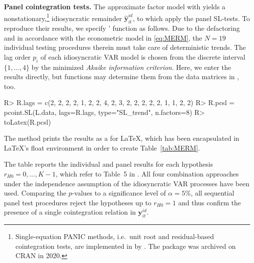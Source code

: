 \textbf{Panel cointegration tests.} The approximate factor model with  yields a nonstationary,\footnote{Single-equation PANIC methods, i.e.~unit root and residual-based cointegration tests, are implemented in  by \citet{Bronder2016}. The  package was archived on CRAN in 2020.} idiosyncratic remainder $ \boldsymbol{\hat{y}}^{i \! d}_{it} $, to which \citet{OersalArsova2017} apply the panel SL-tests. To reproduce their results, we specify ' function  as follows. Due to the defactoring and in accordance with the econometric model in \eqref{eq:MERM}, the $ N=19 $ individual testing procedures therein must take care of deterministic trends. The lag order $ p_i $ of each idiosyncratic VAR model is chosen from the discrete interval $ \lbrace 1,\ldots,4 \rbrace $ by the minimized \textit{Akaike information criterion}. Here, we enter the results directly, but  functions may determine them from the data matrices in , too.
\begin{CodeChunk}
\begin{CodeInput}
R> R.lags = c(2, 2, 2, 2, 1, 2, 2, 4, 2, 3, 2, 2, 2, 2, 2, 1, 1, 2, 2)
R> R.pcsl = pcoint.SL(L.data, lags=R.lags, type="SL_trend", n.factors=8)
R> toLatex(R.pcsl)
\end{CodeInput}
\end{CodeChunk}
The method  prints the  results as a  for LaTeX, which has been encapsulated in LaTeX's float environment in order to create Table~\ref{tab:MERM}. 
\begin{table}[ht]	%
	\centering
	\caption[Cointegration rank tests]{Panel cointegration rank tests for MERM.} 
	\resizebox{0.8\textwidth}{!}{
		}	
	\label{tab:MERM}
\end{table}
The table reports the individual and panel results for each hypothesis $ r_{H0} = 0, \ldots, K-1 $, which refer to Table~5 in \citet[p.~68]{OersalArsova2017}. All four combination approaches under the independence assumption of the idiosyncratic VAR processes have been used. Comparing the $p$-values to a significance level of $ \alpha = 5 \% $, all sequential panel test procedures reject the hypotheses up to $ r_{H0} = 1 $ and thus confirm the presence of a single cointegration relation in $ \boldsymbol{{y}}^{i \! d}_{it} $.


